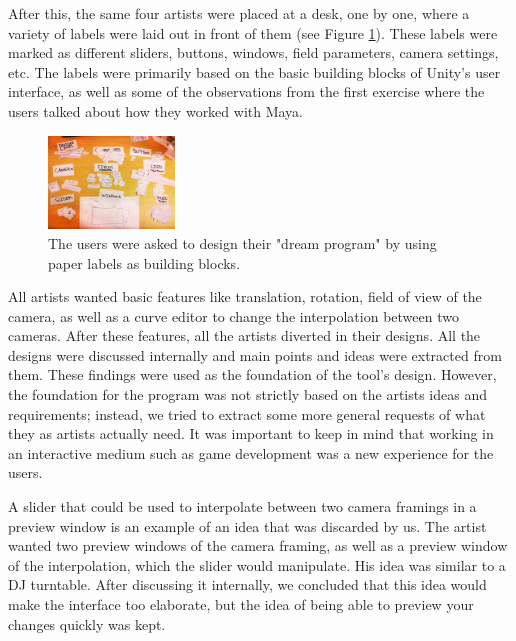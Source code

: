After this, the same four artists were placed at a desk, one by one, where a variety of labels were laid out in front of them (see Figure \ref{fig:labels}). These labels were marked as different sliders, buttons, windows, field parameters, camera settings, etc. The labels were primarily based on the basic building blocks of Unity's user interface, as well as some of the observations from the first exercise where the users talked about how they worked with Maya.

\begin{figure}[htbp]
\centering
\includegraphics[width=0.3\textwidth]{Pics/labels}
\caption{The users were asked to design their "dream program" by using paper labels as building blocks.}
\label{fig:labels}
\end{figure}

All artists wanted basic features like translation, rotation, field of view of the camera, as well as a curve editor to change the interpolation between two cameras. After these features, all the artists diverted in their designs. All the designs were discussed internally and main points and ideas were extracted from them. These findings were used as the foundation of the tool's design. However, the foundation for the program was not strictly based on the artists ideas and requirements; instead, we tried to extract some more general requests of what they as artists actually need. It was important to keep in mind that working in an interactive medium such as game development was a new experience for the users.

A slider that could be used to interpolate between two camera framings in a preview window is an example of an idea that was discarded by us. The artist wanted two preview windows of the camera framing, as well as a preview window of the interpolation, which the slider would manipulate. His idea was similar to a DJ turntable. After discussing it internally, we concluded that this idea would make the interface too elaborate, but the idea of being able to preview your changes quickly was kept.


